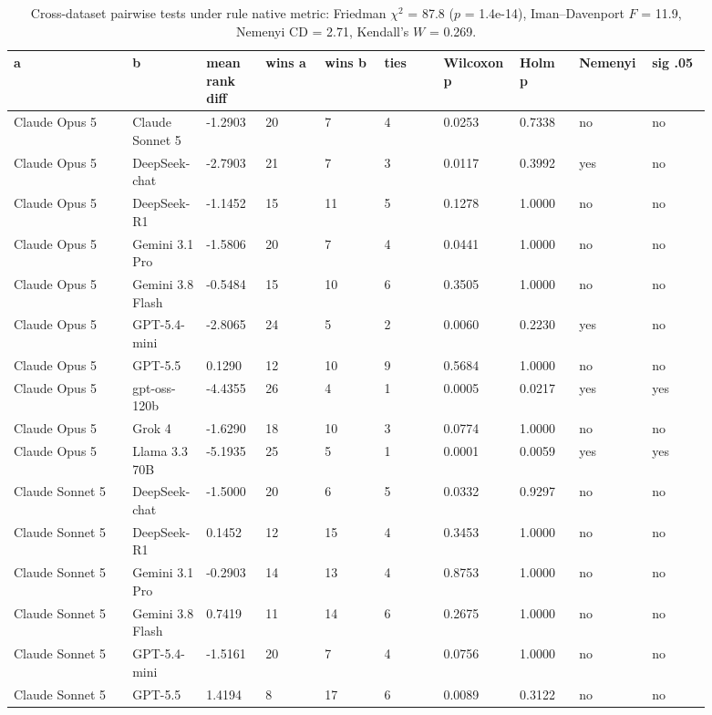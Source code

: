 \begin{landscape}
\tiny
\setlength{\tabcolsep}{3pt}
\begin{longtable}{p{0.162\linewidth}p{0.081\linewidth}p{0.081\linewidth}p{0.081\linewidth}p{0.081\linewidth}p{0.081\linewidth}p{0.081\linewidth}p{0.081\linewidth}p{0.081\linewidth}p{0.081\linewidth}}
\caption{Cross-dataset pairwise tests under rule native metric: Friedman $\chi^2$ = 87.8 ($p$ = 1.4e-14), Iman--Davenport $F$ = 11.9, Nemenyi CD = 2.71, Kendall's $W$ = 0.269.}\label{tab:pairwise_native}\\
\toprule
a & b & mean rank diff & wins a & wins b & ties & Wilcoxon p & Holm p & Nemenyi & sig .05 \\
\midrule
Claude Opus 5 & Claude Sonnet 5 & -1.2903 & 20 & 7 & 4 & 0.0253 & 0.7338 & no & no \\
Claude Opus 5 & DeepSeek-chat & -2.7903 & 21 & 7 & 3 & 0.0117 & 0.3992 & yes & no \\
Claude Opus 5 & DeepSeek-R1 & -1.1452 & 15 & 11 & 5 & 0.1278 & 1.0000 & no & no \\
Claude Opus 5 & Gemini 3.1 Pro & -1.5806 & 20 & 7 & 4 & 0.0441 & 1.0000 & no & no \\
Claude Opus 5 & Gemini 3.8 Flash & -0.5484 & 15 & 10 & 6 & 0.3505 & 1.0000 & no & no \\
Claude Opus 5 & GPT-5.4-mini & -2.8065 & 24 & 5 & 2 & 0.0060 & 0.2230 & yes & no \\
Claude Opus 5 & GPT-5.5 & 0.1290 & 12 & 10 & 9 & 0.5684 & 1.0000 & no & no \\
Claude Opus 5 & gpt-oss-120b & -4.4355 & 26 & 4 & 1 & 0.0005 & 0.0217 & yes & yes \\
Claude Opus 5 & Grok 4 & -1.6290 & 18 & 10 & 3 & 0.0774 & 1.0000 & no & no \\
Claude Opus 5 & Llama 3.3 70B & -5.1935 & 25 & 5 & 1 & 0.0001 & 0.0059 & yes & yes \\
Claude Sonnet 5 & DeepSeek-chat & -1.5000 & 20 & 6 & 5 & 0.0332 & 0.9297 & no & no \\
Claude Sonnet 5 & DeepSeek-R1 & 0.1452 & 12 & 15 & 4 & 0.3453 & 1.0000 & no & no \\
Claude Sonnet 5 & Gemini 3.1 Pro & -0.2903 & 14 & 13 & 4 & 0.8753 & 1.0000 & no & no \\
Claude Sonnet 5 & Gemini 3.8 Flash & 0.7419 & 11 & 14 & 6 & 0.2675 & 1.0000 & no & no \\
Claude Sonnet 5 & GPT-5.4-mini & -1.5161 & 20 & 7 & 4 & 0.0756 & 1.0000 & no & no \\
Claude Sonnet 5 & GPT-5.5 & 1.4194 & 8 & 17 & 6 & 0.0089 & 0.3122 & no & no \\

\end{longtable}
\end{landscape}
